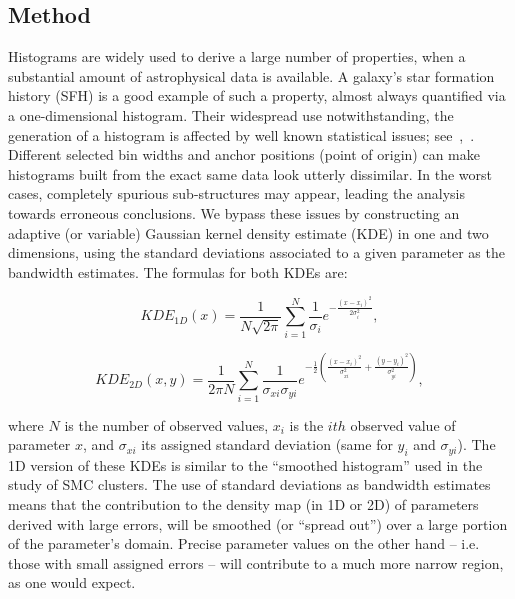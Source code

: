 \documentclass[draft]{aa}
\begin{document}

\subsection{Method}
\label{ssec:kde_method}

Histograms are widely used to derive a large number of properties, when a
substantial amount of astrophysical data is available. A galaxy's star
formation history (SFH) is a good example of such a property, almost always
quantified via a one-dimensional histogram.
%
Their widespread use notwithstanding, the generation of a histogram is affected
by well known statistical issues;
see~\cite{Silverman_1986},~\cite{Simonoff_1997}. Different selected bin widths
and anchor positions (point of origin) can make histograms built
from the exact same data look utterly dissimilar. In the worst cases, completely
spurious sub-structures may appear, leading the analysis towards erroneous
conclusions.
%
We bypass these issues by constructing an adaptive (or variable) Gaussian kernel
density estimate (KDE) in one and two dimensions, using the standard deviations
associated to a given parameter as the bandwidth estimates. The formulas for
both KDEs are:

\begin{equation}
KDE_{1D}(x) = \frac{1}{N\sqrt{2\pi}} \sum_{i=1}^N \frac{1}{\sigma_i}
e^{-\frac{(x-x_i)^2}{2\sigma_i^2}},
\label{eq:kde-1d}
\end{equation}

\begin{equation}
KDE_{2D}(x,y) = \frac{1}{2\pi N} \sum_{i=1}^N \frac{1}{\sigma_{xi}\sigma_{yi}}
e^{-\frac{1}{2} \left( \frac{(x-x_i)^2}{\sigma_{xi}^2} + 
\frac{(y-y_i)^2}{\sigma_{yi}^2} \right)},
\label{eq:kde-2d}
\end{equation}

\noindent where $N$ is the number of observed values, $x_i$ is the $ith$
observed value of parameter $x$, and $\sigma_{xi}$ its assigned standard
deviation (same for $y_i$ and $\sigma_{yi}$). The 1D version of these KDEs is
similar to the ``smoothed histogram'' used in the~\cite{Rafelski_2005} study of
SMC clusters.
%
The use of standard deviations as bandwidth estimates means that the
contribution to the density map (in 1D or 2D) of parameters derived with large
errors, will be smoothed (or ``spread out'') over a large portion of the
parameter's domain. Precise parameter values on the other hand -- i.e. those
with small assigned errors -- will contribute to a much more narrow region, as
one would expect.
\end{document}
